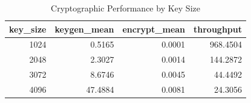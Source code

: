 \begin{table}[htbp]
\centering
\caption{Cryptographic Performance by Key Size}
\label{tab:crypto_perf}
\begin{tabular}{rrrr}
\toprule
key_size & keygen_mean & encrypt_mean & throughput \\
\midrule
1024 & 0.5165 & 0.0001 & 968.4504 \\
2048 & 2.3027 & 0.0014 & 144.2872 \\
3072 & 8.6746 & 0.0045 & 44.4492 \\
4096 & 47.4884 & 0.0081 & 24.3056 \\
\bottomrule
\end{tabular}
\end{table}
